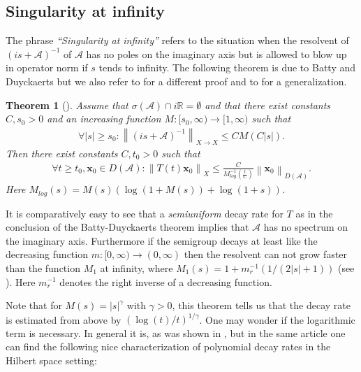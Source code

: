 \documentclass{amsart}
\newcommand{\abs}[1]{\left|#1\right|}
\newcommand{\norm}[1]{\left\| #1 \right\|}
\newcommand{\A}{\mathcal{A}}
\newcommand{\xnice}{\mathbf{x}}
\newcommand{\R}{\mathbb{R}}
\newtheorem{Theorem}{Theorem}
\begin{document}
\begin{appendix}
\subsection{Singularity at infinity}
The phrase \emph{``Singularity at infinity''} refers to the situation when the resolvent of $(is+\A)^{-1}$ of $\A$ has no poles on the imaginary axis but is allowed to blow up in operator norm if $s$ tends to infinity. The following theorem is due to Batty and Duyckaerts \cite{BattyDuyckaerts2008} but we also refer to \cite{ChillSeifert2016} for a different proof and to \cite{BattyBorichevTomilov2016} for a generalization. 

\begin{Theorem}[\cite{BattyDuyckaerts2008}]\label{thm: Batty-Duyckaerts}
 Assume that $\sigma(\A)\cap i\R=\emptyset$ and that there exist constants $C, s_0 > 0$ and an increasing function $M:[s_0,\infty)\rightarrow[1,\infty)$ such that 
 \begin{align}\label{eq: resolvent estimate at infinity}
  \forall \abs{s}\geq s_0: \norm{(is+\A)^{-1}}_{X\rightarrow X} \leq C M(C\abs{s}).
 \end{align}
 Then there exist constants $C,t_0 > 0$ such that
 \begin{align*}
  \forall t\geq t_0, \xnice_0 \in D(\A): \norm{T(t)\xnice_0}_{X} \leq \frac{C}{M_{log}^{-1}(\frac{t}{C})}\norm{\xnice_0}_{D(\A)}.
 \end{align*}
 Here $M_{log}(s) = M(s)(\log(1+M(s))+\log(1+s))$.
\end{Theorem}
It is comparatively easy to see that a \emph{semiuniform} decay rate for $T$ as in the conclusion of the Batty-Duyckaerts theorem implies that $\A$ has no spectrum on the imaginary axis. Furthermore if the semigroup decays at least like the decreasing function $m:[0,\infty)\rightarrow(0,\infty)$ then the resolvent can not grow faster than the function $M_1$ at infinity, where $M_1(s)=1+m_r^{-1}(1/(2\abs{s}+1))$ (see \cite[Proposition 1.3]{BattyDuyckaerts2008}). Here $m_r^{-1}$ denotes the right inverse of a decreasing function.

Note that for $M(s)=\abs{s}^{\gamma}$ with $\gamma>0$, this theorem tells us that the decay rate is estimated from above by $(\log(t)/t)^{1/\gamma}$. One may wonder if the logarithmic term is necessary. In general it is, as was shown in \cite{BorichevTomilov2010}, but in the same article one can find the following nice characterization of polynomial decay rates in the Hilbert space setting:


\end{appendix}
\end{document}

